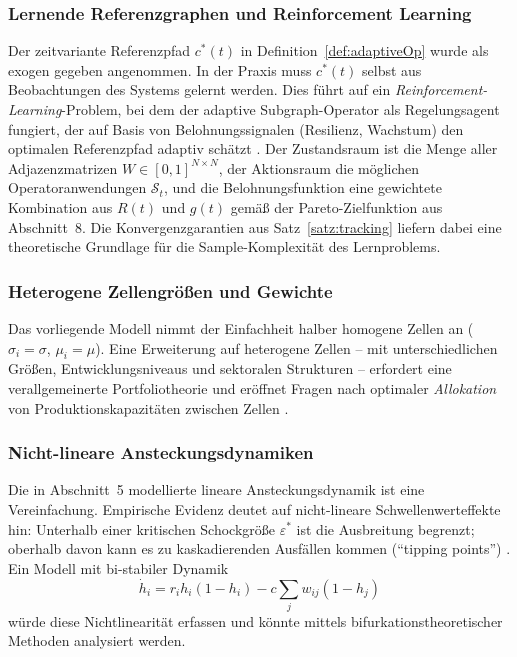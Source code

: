 \documentclass[a4paper, 12pt, twoside, openright]{report}
\theoremstyle{definition}
\theoremstyle{definition}
\begin{document}
\subsubsection{Lernende Referenzgraphen und Reinforcement Learning}

Der zeitvariante Referenzpfad $c^*(t)$ in Definition~\ref{def:adaptiveOp} wurde
als exogen gegeben angenommen. In der Praxis muss $c^*(t)$ selbst aus Beobachtungen
des Systems gelernt werden. Dies führt auf ein \emph{Reinforcement-Learning}-Problem,
bei dem der adaptive Subgraph-Operator als Regelungsagent fungiert, der auf Basis
von Belohnungssignalen (Resilienz, Wachstum) den optimalen Referenzpfad adaptiv
schätzt \citep{sutton2018reinforcement}. Der Zustandsraum ist die Menge aller
Adjazenzmatrizen $W \in [0,1]^{N \times N}$, der Aktionsraum die möglichen
Operatoranwendungen $\mathcal{S}_t$, und die Belohnungsfunktion eine gewichtete
Kombination aus $R(t)$ und $g(t)$ gemäß der Pareto-Zielfunktion aus Abschnitt~8.
Die Konvergenzgarantien aus Satz~\ref{satz:tracking} liefern dabei eine
theoretische Grundlage für die Sample-Komplexität des Lernproblems.

\subsubsection{Heterogene Zellengrößen und Gewichte}

Das vorliegende Modell nimmt der Einfachheit halber homogene Zellen an ($\sigma_i = \sigma$,
$\mu_i = \mu$). Eine Erweiterung auf heterogene Zellen -- mit unterschiedlichen Größen,
Entwicklungsniveaus und sektoralen Strukturen -- erfordert eine verallgemeinerte
Portfoliotheorie und eröffnet Fragen nach optimaler \emph{Allokation} von Produktionskapazitäten
zwischen Zellen \citep{markowitz1952portfolio}.

\subsubsection{Nicht-lineare Ansteckungsdynamiken}

Die in Abschnitt~5 modellierte lineare Ansteckungsdynamik ist eine Vereinfachung.
Empirische Evidenz deutet auf nicht-lineare Schwellenwerteffekte hin: Unterhalb einer
kritischen Schockgröße $\varepsilon^*$ ist die Ausbreitung begrenzt; oberhalb davon
kann es zu kaskadierenden Ausfällen kommen (``tipping points'') \citep{may2008complex}.
Ein Modell mit bi-stabiler Dynamik
\[
    \dot{h}_i = r_i h_i (1-h_i) - c \sum_j w_{ij}(1-h_j)
\]
würde diese Nichtlinearität erfassen und könnte mittels bifurkationstheoretischer Methoden
analysiert werden.
\end{document}

